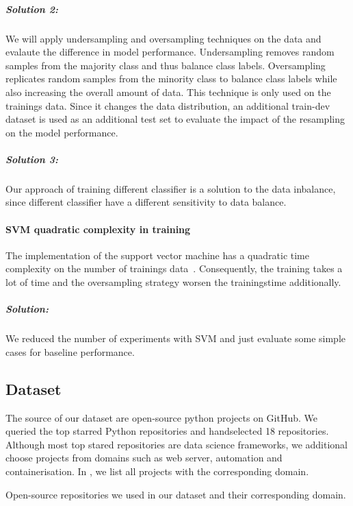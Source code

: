 \subparagraph{Solution 2:}
We will apply undersampling and oversampling techniques on the data and evalaute the difference in model performance. Undersampling removes random samples from the majority class and thus balance class labels. Oversampling replicates random samples from the minority class to balance class labels while also increasing the overall amount of data. This technique is only used on the trainings data. Since it changes the data distribution, an additional train-dev dataset is used as an additional test set to evaluate the impact of the resampling on the model performance. 

\subparagraph{Solution 3:}
Our approach of training different classifier is a solution to the data inbalance, since different classifier have a different sensitivity to data balance. 

\paragraph{SVM quadratic complexity in training}\label{sec:svm_quadratic_complexity}
The implementation of the support vector machine has a quadratic time complexity on the number of trainings data~\cite{abdiansah_time_2015}. Consequently, the training takes a lot of time and the oversampling strategy worsen the trainingstime additionally. 
\subparagraph{Solution:}
We reduced the number of experiments with SVM and just evaluate some simple cases for baseline performance. 


\subsection{Dataset}\label{chap:clean_code_classification_dataset}
The source of our dataset are open-source python projects on GitHub. We queried the top starred Python repositories and handselected 18 repositories. Although most top stared repositories are data science frameworks, we additional choose projects from domains such as web server, automation and containerisation. In , we list all projects with the corresponding domain.
\begin{table}[h]
    \centering
    \caption{Open-source repositories we used in our dataset and their corresponding domain. }
    \label{tab:repos_domains}
\end{table}

